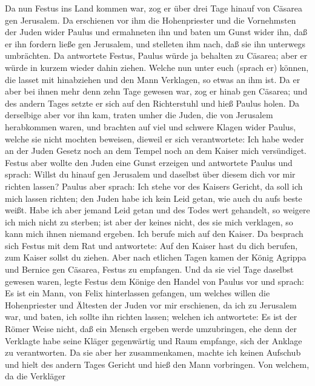  Da nun Festus ins Land kommen war, zog er über drei Tage
hinauf von Cäsarea gen Jerusalem.  Da erschienen vor ihm die
Hohenpriester und die Vornehmsten der Juden wider Paulus und ermahneten
ihn  und baten um Gunst wider ihn, daß er ihn fordern ließe
gen Jerusalem, und stelleten ihm nach, daß sie ihn unterwegs umbrächten.
 Da antwortete Festus, Paulus würde ja behalten zu Cäsarea;
aber er würde in kurzem wieder dahin ziehen.  Welche nun
unter euch (sprach er) können, die lasset mit hinabziehen und den Mann
Verklagen, so etwas an ihm ist.  Da er aber bei ihnen mehr
denn zehn Tage gewesen war, zog er hinab gen Cäsarea; und des andern
Tages setzte er sich auf den Richterstuhl und hieß Paulus holen.
 Da derselbige aber vor ihn kam, traten umher die Juden, die
von Jerusalem herabkommen waren, und brachten auf viel und schwere
Klagen wider Paulus, welche sie nicht mochten beweisen, 
dieweil er sich verantwortete: Ich habe weder an der Juden Gesetz noch
an dem Tempel noch an dem Kaiser mich versündiget.  Festus
aber wollte den Juden eine Gunst erzeigen und antwortete Paulus und
sprach: Willst du hinauf gen Jerusalem und daselbst über diesem dich vor
mir richten lassen?  Paulus aber sprach: Ich stehe vor des
Kaisers Gericht, da soll ich mich lassen richten; den Juden habe ich
kein Leid getan, wie auch du aufs beste weißt.  Habe ich
aber jemand Leid getan und des Todes wert gehandelt, so weigere ich mich
nicht zu sterben; ist aber der keines nicht, des sie mich verklagen, so
kann mich ihnen niemand ergeben. Ich berufe mich auf den Kaiser.
 Da besprach sich Festus mit dem Rat und antwortete: Auf
den Kaiser hast du dich berufen, zum Kaiser sollst du ziehen.
 Aber nach etlichen Tagen kamen der König Agrippa und
Bernice gen Cäsarea, Festus zu empfangen.  Und da sie viel
Tage daselbst gewesen waren, legte Festus dem Könige den Handel von
Paulus vor und sprach: Es ist ein Mann, von Felix hinterlassen gefangen,
 um welches willen die Hohenpriester und Ältesten der Juden
vor mir erschienen, da ich zu Jerusalem war, und baten, ich sollte ihn
richten lassen;  welchen ich antwortete: Es ist der Römer
Weise nicht, daß ein Mensch ergeben werde umzubringen, ehe denn der
Verklagte habe seine Kläger gegenwärtig und Raum empfange, sich der
Anklage zu verantworten.  Da sie aber her zusammenkamen,
machte ich keinen Aufschub und hielt des andern Tages Gericht und hieß
den Mann vorbringen.  Von welchem, da die Verkläger
